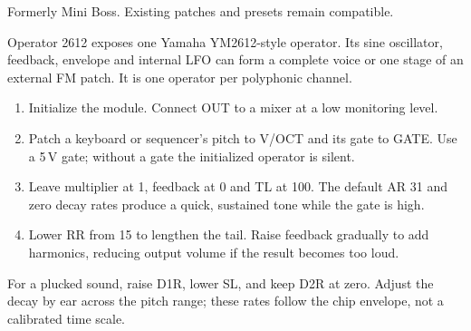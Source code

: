 Formerly Mini Boss. Existing patches and presets remain compatible.

Operator 2612 exposes one Yamaha YM2612-style operator. Its sine oscillator,
feedback, envelope and internal LFO can form a complete voice or one stage
of an external FM patch. It is one operator per polyphonic channel.

\begin{enumerate}
\item Initialize the module. Connect OUT to a mixer at a low monitoring level.
\item Patch a keyboard or sequencer's pitch to V/OCT and its gate to GATE.
Use a 5\,V gate; without a gate the initialized operator is silent.
\item Leave multiplier at 1, feedback at 0 and TL at 100. The default AR 31
and zero decay rates produce a quick, sustained tone while the gate is high.
\item Lower RR from 15 to lengthen the tail. Raise feedback gradually to
add harmonics, reducing output volume if the result becomes too loud.
\end{enumerate}

For a plucked sound, raise D1R, lower SL, and keep D2R at zero. Adjust the
decay by ear across the pitch range; these rates follow the chip envelope,
not a calibrated time scale.
